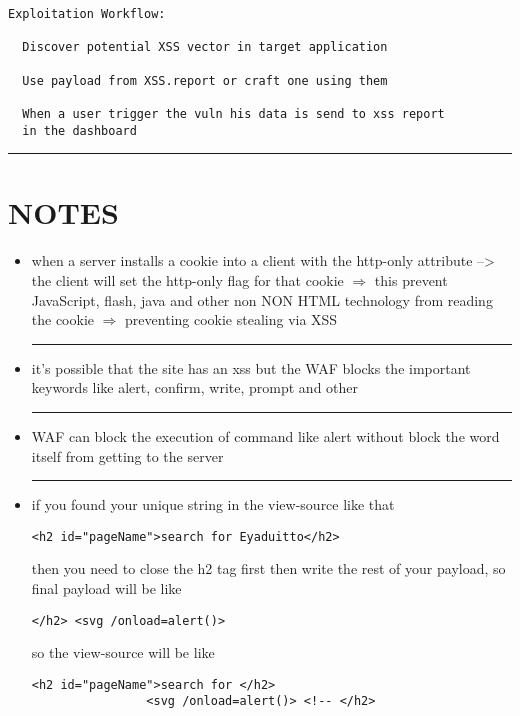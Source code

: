 \documentclass{article}
\begin{document}
\begin{lstlisting}[frame=single]
Exploitation Workflow:

  Discover potential XSS vector in target application

  Use payload from XSS.report or craft one using them

  When a user trigger the vuln his data is send to xss report 
  in the dashboard
    \end{lstlisting}

\rule{15cm}{0.6pt}
\section*{NOTES}
\begin{itemize}
    \item when a server installs a cookie into a client with the http-only attribute -->
          the client will set the http-only flag for that cookie $\Longrightarrow$ this
          prevent JavaScript, flash, java and other non NON HTML technology from reading
          the cookie $\Longrightarrow$ preventing cookie stealing via XSS\\
    \rule{5cm}{0.4pt}
    \item it's possible that the site has an xss but the WAF blocks the important
          keywords like alert, confirm, write, prompt and other\\
    \rule{5cm}{0.4pt}
    \item WAF can block the execution of command like alert without block the word itself
          from getting to the server\\
    \rule{5cm}{0.4pt}
    \item if you found your unique string in the view-source like that
          \begin{lstlisting}[frame=single]
                <h2 id="pageName">search for Eyaduitto</h2>
            \end{lstlisting}
          then you need to close the h2 tag first then write the rest of your payload, so
          final payload will be like
          \begin{lstlisting}[frame=single]
                    </h2> <svg /onload=alert()>
            \end{lstlisting}
          so the view-source will be like
          \begin{lstlisting}[frame=single]
                <h2 id="pageName">search for </h2>
                <svg /onload=alert()> <!-- </h2>
            \end{lstlisting}

\end{itemize}
\end{document}
